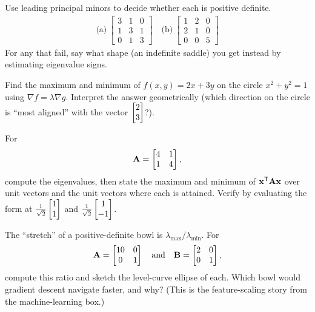 \begin{exercise}
\label{ch36:exr-sylvester}
Use leading principal minors to decide whether each is positive definite.
\begin{align*}
  \text{(a)}~\begin{bmatrix}3&1&0\\1&3&1\\0&1&3\end{bmatrix} \quad
  \text{(b)}~\begin{bmatrix}1&2&0\\2&1&0\\0&0&5\end{bmatrix}
\end{align*}
For any that fail, say what shape (an indefinite saddle) you get instead by
estimating eigenvalue signs.
\end{exercise}

\begin{exercise}
\label{ch36:exr-lagrange}
Find the maximum and minimum of $f(x,y)=2x+3y$ on the circle $x^2+y^2=1$ using
$\nabla f=\lambda\nabla g$. Interpret the answer geometrically (which direction on the
circle is ``most aligned'' with the vector $\begin{bmatrix}2\\3\end{bmatrix}$?).
\end{exercise}

\begin{exercise}
\label{ch36:exr-rayleigh}
For
\[
  \mathbf{A}=\begin{bmatrix}4&1\\1&4\end{bmatrix},
\]
compute the eigenvalues, then
state the maximum and minimum of $\mathbf{x}^{\mathsf{T}}\mathbf{A}\mathbf{x}$ over unit vectors and the
unit vectors where each is attained. Verify by evaluating the form at
$\tfrac{1}{\sqrt2}\begin{bmatrix}1\\1\end{bmatrix}$ and $\tfrac{1}{\sqrt2}\begin{bmatrix}1\\-1\end{bmatrix}$.
\end{exercise}

\begin{exercise}
\label{ch36:exr-condition}
The ``stretch'' of a positive-definite bowl is $\lambda_{\max}/\lambda_{\min}$. For
\[
  \mathbf{A}=\begin{bmatrix}10&0\\0&1\end{bmatrix} \quad \text{and} \quad
  \mathbf{B}=\begin{bmatrix}2&0\\0&1\end{bmatrix},
\]
compute this ratio and sketch the
level-curve ellipse of each. Which bowl would gradient descent navigate faster, and
why? (This is the feature-scaling story from the machine-learning box.)
\end{exercise}

